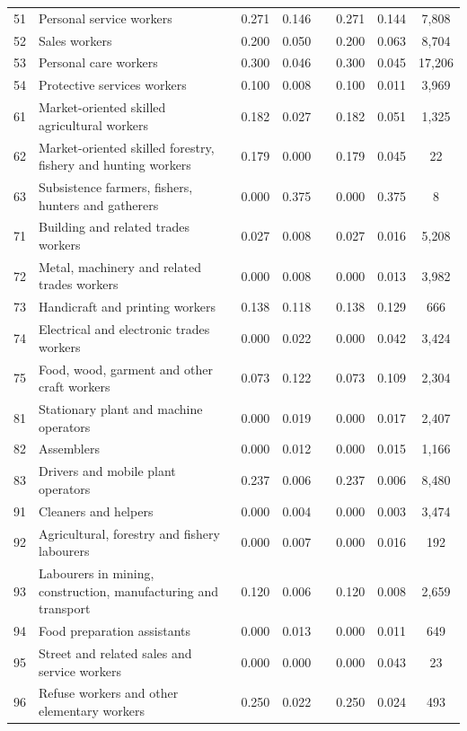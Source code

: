 \begin{tabular}{lp{5.2cm}cccccc}
51 & Personal service workers & 0.271 & 0.146 &  & 0.271 & 0.144 & 7{,}808 \\
52 & Sales workers & 0.200 & 0.050 &  & 0.200 & 0.063 & 8{,}704 \\
53 & Personal care workers & 0.300 & 0.046 &  & 0.300 & 0.045 & 17{,}206 \\
54 & Protective services workers & 0.100 & 0.008 &  & 0.100 & 0.011 & 3{,}969 \\
61 & Market-oriented skilled agricultural workers & 0.182 & 0.027 &  & 0.182 & 0.051 & 1{,}325 \\
62 & Market-oriented skilled forestry, fishery and hunting workers & 0.179 & 0.000 &  & 0.179 & 0.045 & 22 \\
63 & Subsistence farmers, fishers, hunters and gatherers & 0.000 & 0.375 &  & 0.000 & 0.375 & 8 \\
71 & Building and related trades workers & 0.027 & 0.008 &  & 0.027 & 0.016 & 5{,}208 \\
72 & Metal, machinery and related trades workers & 0.000 & 0.008 &  & 0.000 & 0.013 & 3{,}982 \\
73 & Handicraft and printing workers & 0.138 & 0.118 &  & 0.138 & 0.129 & 666 \\
74 & Electrical and electronic trades workers & 0.000 & 0.022 &  & 0.000 & 0.042 & 3{,}424 \\
75 & Food, wood, garment and other craft workers & 0.073 & 0.122 &  & 0.073 & 0.109 & 2{,}304 \\
81 & Stationary plant and machine operators & 0.000 & 0.019 &  & 0.000 & 0.017 & 2{,}407 \\
82 & Assemblers & 0.000 & 0.012 &  & 0.000 & 0.015 & 1{,}166 \\
83 & Drivers and mobile plant operators & 0.237 & 0.006 &  & 0.237 & 0.006 & 8{,}480 \\
91 & Cleaners and helpers & 0.000 & 0.004 &  & 0.000 & 0.003 & 3{,}474 \\
92 & Agricultural, forestry and fishery labourers & 0.000 & 0.007 &  & 0.000 & 0.016 & 192 \\
93 & Labourers in mining, construction, manufacturing and transport & 0.120 & 0.006 &  & 0.120 & 0.008 & 2{,}659 \\
94 & Food preparation assistants & 0.000 & 0.013 &  & 0.000 & 0.011 & 649 \\
95 & Street and related sales and service workers & 0.000 & 0.000 &  & 0.000 & 0.043 & 23 \\
96 & Refuse workers and other elementary workers & 0.250 & 0.022 &  & 0.250 & 0.024 & 493 \\
\bottomrule
\end{tabular}
